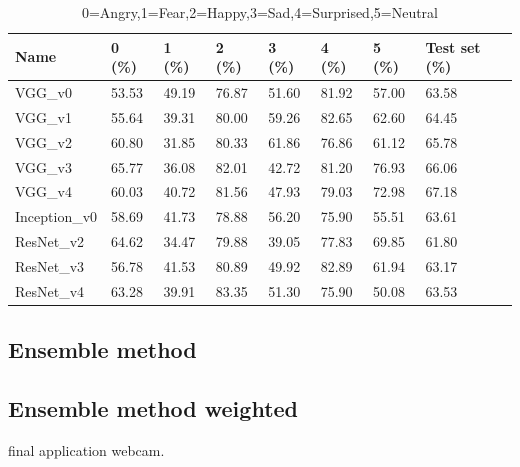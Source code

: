 \documentclass[10pt,twocolumn,letterpaper]{article}
\begin{document}
\def\arraystretch{1.2}
\begin{table}[H]
   \scriptsize
   \begin{tabular}{L{1.1cm}C{0.5cm}C{0.5cm}C{0.5cm}C{0.5cm}C{0.5cm}C{0.5cm}C{0.8cm}}
      \hline
      Name          & 0 (\%) & 1 (\%) & 2 (\%) & 3 (\%) & 4 (\%) & 5 (\%) & Test set (\%) \\
      \hline\hline
      VGG\_v0       & 53.53  & 49.19  & 76.87  & 51.60  & 81.92  & 57.00  & 63.58         \\
      VGG\_v1       & 55.64  & 39.31  & 80.00  & 59.26  & 82.65  & 62.60  & 64.45         \\
      VGG\_v2       & 60.80  & 31.85  & 80.33  & 61.86  & 76.86  & 61.12  & 65.78         \\
      VGG\_v3       & 65.77  & 36.08  & 82.01  & 42.72  & 81.20  & 76.93  & 66.06         \\
      VGG\_v4       & 60.03  & 40.72  & 81.56  & 47.93  & 79.03  & 72.98  & 67.18         \\
      Inception\_v0 & 58.69  & 41.73  & 78.88  & 56.20  & 75.90  & 55.51  & 63.61         \\
      ResNet\_v2    & 64.62  & 34.47  & 79.88  & 39.05  & 77.83  & 69.85  & 61.80         \\
      ResNet\_v3    & 56.78  & 41.53  & 80.89  & 49.92  & 82.89  & 61.94  & 63.17         \\
      ResNet\_v4    & 63.28  & 39.91  & 83.35  & 51.30  & 75.90  & 50.08  & 63.53         \\
      \hline
   \end{tabular}
   \caption{0=Angry,1=Fear,2=Happy,3=Sad,4=Surprised,5=Neutral}
\end{table}
\subsection*{Ensemble method}
\subsection*{Ensemble method weighted}

final application webcam.
\end{document}

